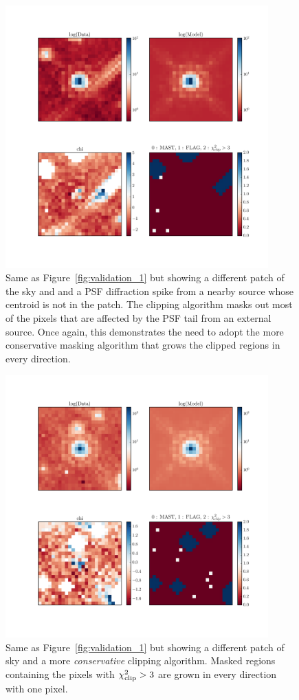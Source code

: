 \begin{figure}
\includegraphics[width=0.9\textwidth]{figures/wfc3ir/example11.pdf}
\caption{\label{fig:validation_4} Same as Figure~\ref{fig:validation_1} but showing a different patch of the sky and and a PSF diffraction spike from a nearby source whose centroid is not in the patch. The clipping algorithm masks out most of the pixels that are affected by the PSF tail from an external source. Once again, this demonstrates the need to adopt the more conservative masking algorithm that grows the clipped regions in every direction.}
\end{figure}

\begin{figure}
\includegraphics[width=0.9\textwidth]{figures/wfc3ir/example10.pdf}
\caption{\label{fig:validation_5} Same as Figure~\ref{fig:validation_1} but showing a different patch of sky and a more \emph{conservative} clipping algorithm. Masked regions containing the pixels with $\chi^{2}_{\rm clip} > 3$ are grown in every direction with one pixel.}
\end{figure}

